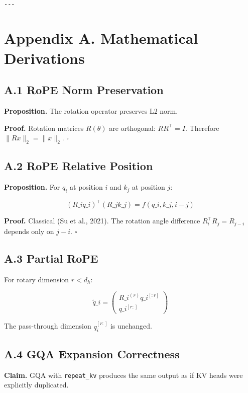 \begin{lstlisting}

---
\end{lstlisting}


\section{Appendix A. Mathematical Derivations}

\subsection{A.1 RoPE Norm Preservation}

\textbf{Proposition.} The rotation operator preserves L2 norm.

\textbf{Proof.} Rotation matrices $R(\theta)$ are orthogonal: $R R^\top = I$. 
Therefore $\|R x\|_2 = \|x\|_2$. $\square$

\subsection{A.2 RoPE Relative Position}

\textbf{Proposition.} For $q_i$ at position $i$ and $k_j$ at position $j$:

\[
(R\_i q\_i)^\top (R\_j k\_j) = f(q\_i, k\_j, i - j)
\tag{A.1}
\]

\textbf{Proof.} Classical (Su et al., 2021). The rotation angle difference 
$R_i^\top R_j = R_{j-i}$ depends only on $j - i$. $\square$

\subsection{A.3 Partial RoPE}

For rotary dimension $r < d_h$:

\[
\tilde{q}\_i = \begin{pmatrix} R\_i^{(r)} q\_i^{[:r]} \\ q\_i^{[r:]} \end{pmatrix}
\tag{A.2}
\]

The pass-through dimension $q_i^{[r:]}$ is unchanged.

\subsection{A.4 GQA Expansion Correctness}

\textbf{Claim.} GQA with \texttt{repeat\_kv} produces the same output as if KV heads 
were explicitly duplicated.

